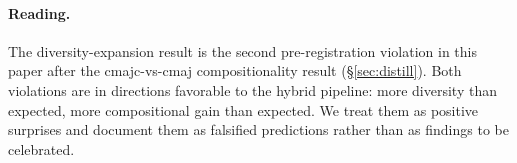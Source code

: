 \paragraph{Reading.}
The diversity-expansion result is the second pre-registration
violation in this paper after the cmajc-vs-cmaj compositionality
result (\S\ref{sec:distill}).  Both violations are in directions
favorable to the hybrid pipeline: more diversity than expected,
more compositional gain than expected.  We treat them as positive
surprises and document them as falsified predictions rather than
as findings to be celebrated.
